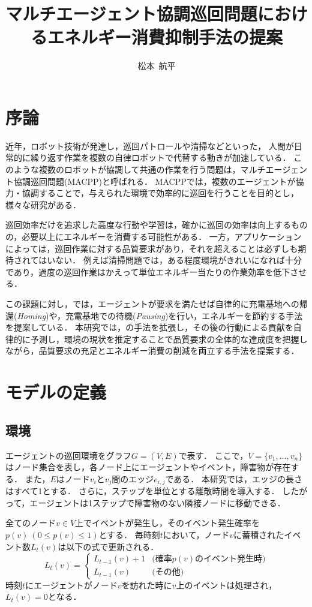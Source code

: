 \documentclass[11pt,a4j,twocolumn]{jarticle}
\title{マルチエージェント協調巡回問題におけるエネルギー消費抑制手法の提案}
\author{松本~航平}
\begin{document}
\maketitle
\section{序論}
近年，ロボット技術が発達し，巡回パトロールや清掃などといった，
人間が日常的に繰り返す作業を複数の自律ロボットで代替する動きが加速している．
このような複数のロボットが協調して共通の作業を行う問題は，マルチエージェント協調巡回問題(MACPP)と呼ばれる．
MACPPでは，複数のエージェントが協力・協調することで，与えられた環境で効率的に巡回を行うことを目的とし，様々な研究がある\cite{Yoneda2013,Wu2019}．
\par

巡回効率だけを追求した高度な行動や学習は，確かに巡回の効率は向上するものの，必要以上にエネルギーを消費する可能性がある．
一方，アプリケーションによっては，巡回作業に対する品質要求があり，それを超えることは必ずしも期待されてはいない．
例えば清掃問題では，ある程度環境がきれいになれば十分であり，過度の巡回作業はかえって単位エネルギー当たりの作業効率を低下させる．
\par

この課題に対し，\cite{Wu2019}では，エージェントが要求を満たせば自律的に充電基地への帰還({\em Homing})や，充電基地での待機({\em Pausing})を行い，エネルギーを節約する手法を提案している．
本研究では，\cite{Wu2019}の手法を拡張し，その後の行動による貢献を自律的に予測し，環境の現状を推定することで品質要求の全体的な達成度を把握しながら，品質要求の充足とエネルギー消費の削減を両立する手法を提案する．

\section{モデルの定義}
\subsection{環境}
エージェントの巡回環境をグラフ$G = (V,E)$で表す．
ここで，$V = \{v_1, \dots, v_n \}$はノード集合を表し，各ノード上にエージェントやイベント，障害物が存在する．
また，$E$はノード$v_i$と$v_j$間のエッジ$e_{i,j}$である．
本研究では，エッジの長さはすべて1とする．
さらに，ステップを単位とする離散時間を導入する．
したがって，エージェントは1ステップで障害物のない隣接ノードに移動できる．
\par

全てのノード$v\in V$上でイベントが発生し，そのイベント発生確率を$p(v)~(0\leq p(v)\leq 1)$とする．
毎時刻$t$において，ノード$v$に蓄積されたイベント数$L_t(v)$は以下の式で更新される．
%
\[
  L_t(v) = \left\{
\begin{array}{ll}
  L_{t-1}(v) + 1 & \textrm{(確率$p(v)$のイベント発生時)} \\
  L_{t-1}(v) & \textrm{(その他)}
\end{array}
\right.  
\]
%
時刻$t$にエージェントがノード$v$を訪れた時に$v$上のイベントは処理され，$L_t(v) = 0$となる．
\end{document}
